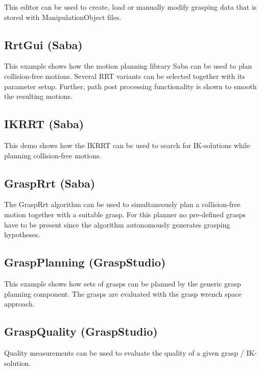 \documentclass{book}
\begin{document}
This editor can be used to create, load or manually modify grasping data that is stored with ManipulationObject files.
\subsection*{RrtGui (Saba)}

This example shows how the motion planning library Saba can be used to plan collision-free motions. Several RRT variants can be selected together with its parameter setup. Further, path post processing functionality is shown to smooth the resulting motions.
\subsection*{IKRRT (Saba)}

This demo shows how the IKRRT can be used to search for IK-solutions while planning collision-free motions.
\subsection*{GraspRrt (Saba)}

The GraspRrt algorithm can be used to simultaneously plan a collision-free motion together with a suitable grasp. For this planner no pre-defined grasps have to be present since the algorithm autonomously generates grasping hypotheses.
\subsection*{GraspPlanning (GraspStudio)}

This example shows how sets of grasps can be planned by the generic grasp planning component. The grasps are evaluated with the grasp wrench space approach.
\subsection*{GraspQuality (GraspStudio)}

Quality measurements can be used to evaluate the quality of a given grasp / IK-solution. 
\end{document}

